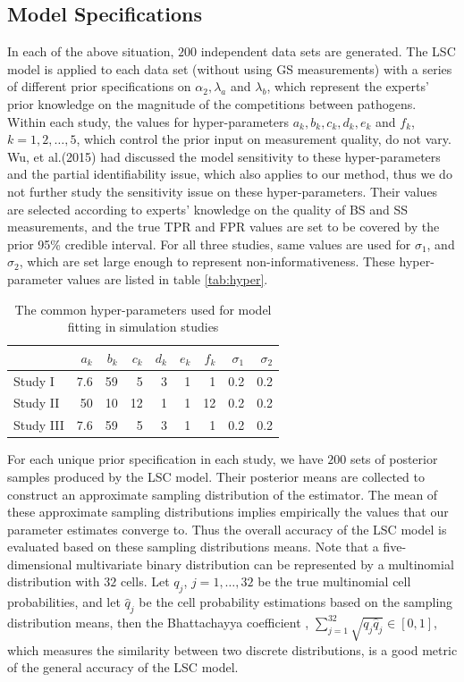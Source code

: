 \documentclass[11 pt, a4paper]{article}  %
\begin{document}
\subsection{Model Specifications}
In each of the above situation, $200$ independent data sets are generated. The LSC model is applied to each data set (without using GS measurements) with a series of different prior specifications on $\alpha_2, \lambda_a$ and $\lambda_b$, which represent the experts' prior knowledge on the magnitude of the competitions between pathogens. Within each study, the values for hyper-parameters $a_k, b_k, c_k, d_k, e_k$ and $f_k$, $k = 1, 2, \ldots, 5$, which control the prior input on measurement quality, do not vary. Wu, et al.(2015) \cite{wu2015partially} had discussed the model sensitivity to these hyper-parameters and the partial identifiability issue, which also applies to our method, thus we do not further study the sensitivity issue on these hyper-parameters. Their values are selected according to experts' knowledge on the quality of BS and SS measurements, and the true TPR and FPR values are set to be covered by the prior 95\% credible interval. For all three studies, same values are used for $\sigma_1$, and $\sigma_2$, which are set large enough to represent non-informativeness. These hyper-parameter values are listed in table \ref{tab:hyper}. \\


\begin{table}[h]
\centering
\caption{The common hyper-parameters used for model fitting in simulation studies}
\label{tab:study3}
\begin{tabular}{lrrrrrrrr}
\hline
          & $a_k$    & $b_k$     & $c_k$     & $d_k$     & $e_k$ & $f_k$ & $\sigma_1$  & $\sigma_2$    \\ \hline
Study I   & 7.6 & 59  & 5  & 3  & 1 & 1 & 0.2 & 0.2 \\
Study II  & 50 & 10  & 12  & 1  & 1 & 12 & 0.2 & 0.2 \\
Study III & 7.6 & 59  & 5  & 3  & 1 & 1 & 0.2 & 0.2 \\ \hline
\end{tabular}
\end{table}


For each unique prior specification in each study, we have $200$ sets of posterior samples produced by the LSC model. Their posterior means are collected to construct an approximate sampling distribution of the estimator. The mean of these approximate sampling distributions implies empirically the values that our parameter estimates converge to. Thus the overall accuracy of the LSC model is evaluated based on these sampling distributions means. Note that a five-dimensional multivariate binary distribution can be represented by a multinomial distribution with $32$ cells. Let $q_{j}$, $j = 1, \ldots, 32$ be the true multinomial cell probabilities, and let $\hat{q}_j$ be the cell probability estimations based on the sampling distribution means, then the Bhattachayya coefficient \cite{bhattachayya1943measure}, $\sum_{j=1}^{32}\sqrt{q_j \hat{q}_j} \in [0, 1]$, which measures the similarity between two discrete distributions, is a good metric of the general accuracy of the LSC model. \\
\end{document}

